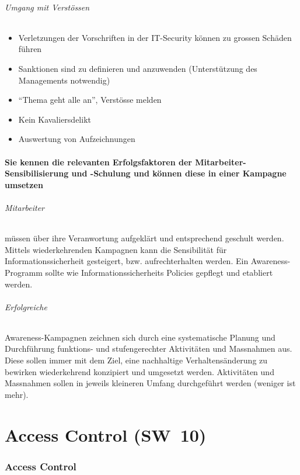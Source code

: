 \documentclass[10pt,a4paper]{article}
\begin{document}
\paragraph*{Umgang mit Verstössen}
\begin{itemize}[noitemsep,topsep=0pt,leftmargin=*]
    \item Verletzungen der Vorschriften in der IT-Security können zu grossen Schäden führen
    \item Sanktionen sind zu definieren und anzuwenden (Unterstützung des Managements notwendig)
    \item "`Thema geht alle an"', Verstösse melden
    \item Kein Kavaliersdelikt
    \item Auswertung von Aufzeichnungen
\end{itemize}

\subsection*{Sie kennen die relevanten Erfolgsfaktoren der Mitarbeiter-Sensibilisierung und -Schulung und können diese in einer Kampagne umsetzen}
\paragraph*{Mitarbeiter} müssen über ihre Veranwortung aufgeklärt und entsprechend geschult werden. Mittels wiederkehrenden Kampagnen kann die Sensibilität für Informationssicherheit gesteigert, bzw. aufrechterhalten werden. Ein Awareness-Programm sollte wie Informationssicherheits Policies gepflegt und etabliert werden.
\paragraph*{Erfolgreiche} Awareness-Kampagnen zeichnen sich durch eine systematische Planung und Durchführung funktions- und stufengerechter Aktivitäten und Massnahmen aus. Diese sollen immer mit dem Ziel, eine nachhaltige Verhaltensänderung zu bewirken wiederkehrend konzipiert und umgesetzt werden. Aktivitäten und Massnahmen sollen in jeweils kleineren Umfang durchgeführt werden (weniger ist mehr). \ \


\pagebreak
\part{Access Control (SW~10)}
\section{Access Control}
\end{document}
